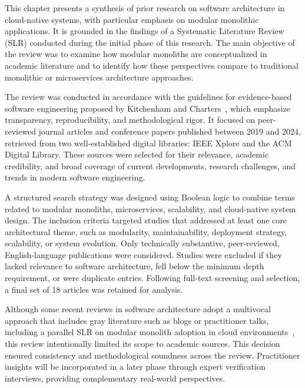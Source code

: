 \label{sec:relatedwork}


This chapter presents a synthesis of prior research on software architecture in cloud-native systems, with particular emphasis on modular monolithic applications. It is grounded in the findings of a Systematic Literature Review (SLR) conducted during the initial phase of this research. The main objective of the review was to examine how modular monoliths are conceptualized in academic literature and to identify how these perspectives compare to traditional monolithic or microservices architecture approaches.

The review was conducted in accordance with the guidelines for evidence-based software engineering proposed by Kitchenham and Charters~\cite{kitchenham2007guidelines}, which emphasize transparency, reproducibility, and methodological rigor. It focused on peer-reviewed journal articles and conference papers published between 2019 and 2024, retrieved from two well-established digital libraries: IEEE Xplore and the ACM Digital Library. These sources were selected for their relevance, academic credibility, and broad coverage of current developments, research challenges, and trends in modern software engineering.

A structured search strategy was designed using Boolean logic to combine terms related to modular monoliths, microservices, scalability, and cloud-native system design. The inclusion criteria targeted studies that addressed at least one core architectural theme, such as modularity, maintainability, deployment strategy, scalability, or system evolution. Only technically substantive, peer-reviewed, English-language publications were considered. Studies were excluded if they lacked relevance to software architecture, fell below the minimum depth requirement, or were duplicate entries. Following full-text screening and selection, a final set of 18 articles was retained for analysis.

Although some recent reviews in software architecture adopt a multivocal approach that includes gray literature such as blogs or practitioner talks, including a parallel SLR on modular monolith adoption in cloud environments~\cite{alqoran2025mma}, this review intentionally limited its scope to academic sources. This decision ensured consistency and methodological soundness across the review. Practitioner insights will be incorporated in a later phase through expert verification interviews, providing complementary real-world perspectives.


